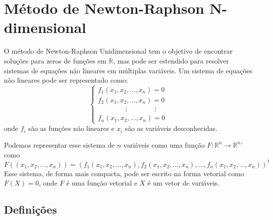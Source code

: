\section{Método de Newton-Raphson N-dimensional}
O método de Newton-Raphson Unidimensional tem o objetivo de encontrar soluções para zeros de funções em $\mathbb{R}$, mas pode ser estendido para resolver sistemas de equações não lineares em múltiplas variáveis. Um sistema de equações não lineares pode ser representado como:
\begin{equation*}
    \begin{cases}
    f_1(x_1, x_2, \ldots, x_n) = 0 \\
    f_2(x_1, x_2, \ldots, x_n) = 0 \\
            \qquad \qquad \vdots \qquad \qquad  \vdots \\
    f_n(x_1, x_2, \ldots, x_n) = 0
    \end{cases}
\end{equation*}
onde  \(f_i \) são as funções não lineares e \(x_i\) são as variáveis desconhecidas.

Podemos representar esse sistema de \textbf{\(n\)} variáveis como uma função \textbf{\(F : \mathbb{R}^n \rightarrow \mathbb{R}^n\)}' como
\begin{equation*}
    F((x_1, x_2, \ldots, x_n)) = (f_1(x_1, x_2, \ldots, x_n), f_2(x_1, x_2, \ldots, x_n), \ldots, f_n(x_1, x_2, \ldots, x_n))^{t}
\end{equation*}
Esse sistema, de forma mais compacta, pode ser escrito na forma vetorial como \textbf{\(F(X) = 0\)}, onde \textbf{\(F\)} é uma função vetorial e \(X\) é um vetor de variáveis.

\subsection{Definições}

